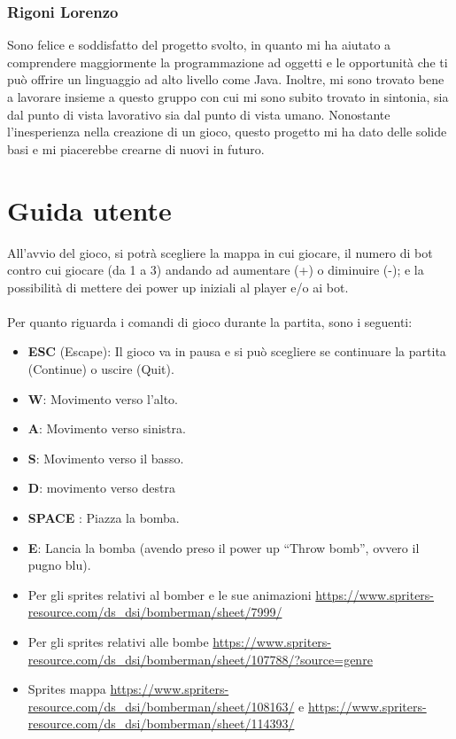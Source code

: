 \documentclass[a4paper,12pt]{report}
\begin{document}
\subsection*{Rigoni Lorenzo}
Sono felice e soddisfatto del progetto svolto, in quanto mi ha aiutato a comprendere maggiormente la programmazione ad oggetti e le opportunità che ti può offrire un linguaggio ad alto livello come Java. Inoltre, mi sono trovato bene a lavorare insieme a questo gruppo con cui mi sono subito trovato in sintonia, sia dal punto di vista lavorativo sia dal punto di vista umano. Nonostante l’inesperienza nella creazione di un gioco, questo progetto mi ha dato delle solide basi e mi piacerebbe crearne di nuovi in futuro.

\appendix
\chapter{Guida utente}

All’avvio del gioco, si potrà scegliere la mappa in cui giocare, il numero di bot contro cui giocare (da 1 a 3) andando ad aumentare (+) o diminuire (-); e la possibilità di mettere dei power up iniziali al player e/o ai bot.
\\
\\
Per quanto riguarda i comandi di gioco durante la partita, sono i seguenti:
\begin{itemize}
    \item \textbf{ESC} (Escape): Il gioco va in pausa e si può scegliere se continuare la partita (Continue) o uscire (Quit).
    \item \textbf{W}: Movimento verso l'alto.
    \item \textbf{A}: Movimento verso sinistra.
    \item \textbf{S}: Movimento verso il basso.
    \item \textbf{D}: movimento verso destra
    \item \textbf{SPACE} : Piazza la bomba.
    \item \textbf{E}: Lancia la bomba (avendo preso il power up “Throw bomb”, ovvero il pugno blu).
\end{itemize}



\begin{itemize}
    \item Per gli sprites relativi al bomber e le sue animazioni  \url{https://www.spriters-resource.com/ds_dsi/bomberman/sheet/7999/}
    \item Per gli sprites relativi alle bombe \url{https://www.spriters-resource.com/ds_dsi/bomberman/sheet/107788/?source=genre}
    \item Sprites mappa \url{https://www.spriters-resource.com/ds_dsi/bomberman/sheet/108163/} e \url{https://www.spriters-resource.com/ds_dsi/bomberman/sheet/114393/}
\end{itemize}
\end{document}
